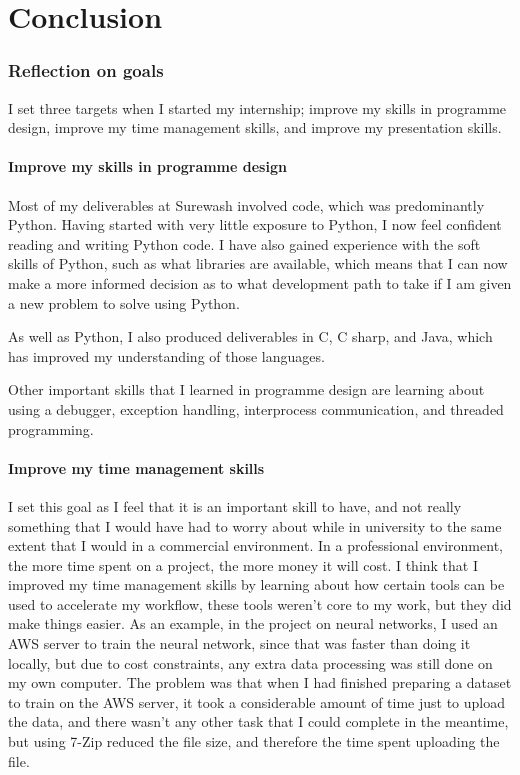\part{Conclusion}
\section{Reflection on goals}
I set three targets when I started my internship; improve my skills in programme design, improve my time management skills, and improve my presentation skills.
    \subsection{Improve my skills in programme design} Most of my deliverables at Surewash involved code, which was predominantly Python. Having started with very little exposure to Python, I now feel confident reading and writing Python code. I have also gained experience with the soft skills of Python, such as what libraries are available, which means that I can now make a more informed decision as to what development path to take if I am given a new problem to solve using Python.

    As well as Python, I also produced deliverables in C, C sharp, and Java, which has improved my understanding of those languages.

    Other important skills that I learned in programme design are learning about using a debugger, exception handling, interprocess communication, and threaded programming.

    \subsection{Improve my time management skills} I set this goal as I feel that it is an important skill to have, and not really something that I would have had to worry about while in university to the same extent that I would in a commercial environment. In a professional environment, the more time spent on a project, the more money it will cost. I think that I improved my time management skills by learning about how certain tools can be used to accelerate my workflow, these tools weren't core to my work, but they did make things easier. As an example, in the project on neural networks, I used an AWS server to train the neural network, since that was faster than doing it locally, but due to cost constraints, any extra data processing was still done on my own computer. The problem was that when I had finished preparing a dataset to train on the AWS server, it took a considerable amount of time just to upload the data, and there wasn't any other task that I could complete in the meantime, but using 7-Zip reduced the file size, and therefore the time spent uploading the file.

